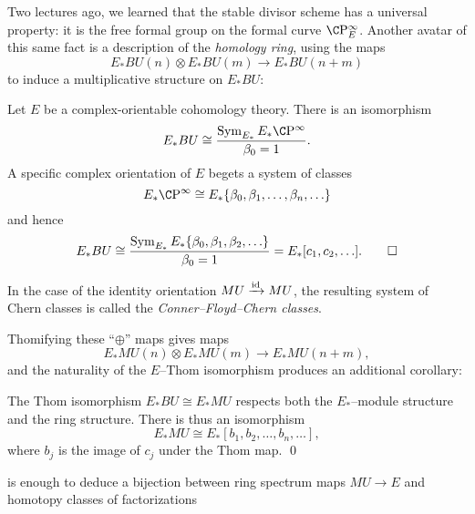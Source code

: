
Two lectures ago, we learned that the stable divisor scheme has a universal property: it is the free formal group on the formal curve $\CP^\infty_E$.  Another avatar of this same fact is a description of the \emph{homology ring}, using the maps \[E_* BU(n) \otimes E_* BU(m) \to E_* BU(n+m)\] to induce a multiplicative structure on $E_* BU$:
\begin{lemma}
Let $E$ be a complex-orientable cohomology theory. There is an isomorphism \[E_* BU \cong \frac{\Sym_{E_*} E_* \CP^\infty}{\beta_0 = 1}.\]  A specific complex orientation of $E$ begets a system of classes \[E_* \CP^\infty \cong E_*\{\beta_0, \beta_1, \ldots, \beta_n, \ldots\}\] and hence \[E_* BU \cong \frac{\operatorname{Sym}_{E_*} E_*\{\beta_0, \beta_1, \beta_2, \ldots\}}{\beta_0 = 1} = E_*[c_1, c_2, \ldots]. \qed\]
\end{lemma}

\begin{definition}
In the case of the identity orientation $MU \xrightarrow{\mathrm{id}} MU$, the resulting system of Chern classes is called the \textit{Conner--Floyd--Chern classes}.
\end{definition}

Thomifying these ``$\oplus$'' maps gives maps \[E_* MU(n) \otimes E_* MU(m) \to E_* MU(n+m),\] and the naturality of the $E$--Thom isomorphism produces an additional corollary:
\begin{corollary}\label{EMUisFree}
The Thom isomorphism $E_* BU \cong E_* MU$ respects both the $E_*$--module structure and the ring structure.  There is thus an isomorphism \[E_* MU \cong E_*[b_1, b_2, \ldots, b_n, \ldots],\] where $b_j$ is the image of $c_j$ under the Thom map. \qed
\end{corollary}

\begin{remark}
 is enough to deduce a bijection between ring spectrum maps $MU \to E$ and homotopy classes of factorizations
\begin{center}
\end{center}
\end{remark}

